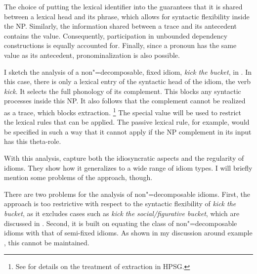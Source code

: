 \documentclass[output=paper
                ,modfonts
                ,nonflat
	        ,collection
	        ,collectionchapter
	        ,collectiontoclongg
 	        ,biblatex
                ,babelshorthands
                ,newtxmath
                ,draftmode
                ,colorlinks, citecolor=brown
]{./langsci/langscibook}
\begin{document}
The choice of putting the lexical identifier into the  guarantees that it is shared between a lexical head and its phrase, which allows for syntactic flexibility inside the NP. 
Similarly, the information shared between a trace and its antecedent contains the  value. Consequently, participation in unbounded dependency constructions is equally accounted for.
Finally, since a pronoun has the same  value as its antecedent, pronominalization is also possible. 
%


I sketch the analysis of a non"=decomposable, fixed idiom, \emph{kick the bucket}, in . 
In this case, there is only a lexical entry of the syntactic head of the idiom, the verb \emph{kick}. 
It selects the full phonology of its complement. This blocks any syntactic processes inside this NP. It also follows that the complement cannot be realized as a trace, which blocks extraction.%
\footnote{See  for details on the treatment of extraction in HPSG.}
The special  value  will be used to 
restrict the lexical rules that can be applied. 
The passive lexical rule, for example, would be specified in such a way that it cannot apply if the NP complement in its input has this theta-role.


\ea %
\label{ke-kick}
\z 


With this analysis, \citet{KE94a} capture both the idiosyncratic aspects and the regularity of idioms. 
They show how it generalizes to a wide range of idiom types. 
I will briefly mention some problems of the approach, though.

There are two problems for the analysis of non"=decomposable idioms. 
First, the approach is too restrictive with respect to the syntactic flexibility of \emph{kick the bucket}, as it excludes cases such as \emph{kick the social/figurative bucket}, which are discussed in  \citet{Ernst:81}. 
Second, it is built on equating the class of non"=decomposable idioms with that of semi-fixed idioms. As shown in my discussion around example , this cannot be maintained. 
\end{document}
